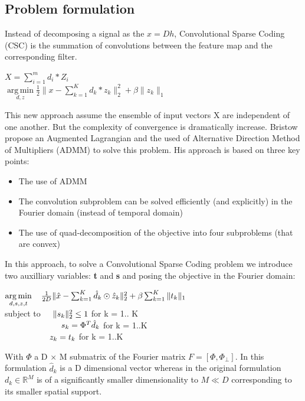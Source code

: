 \documentclass[a4paper,10pt]{article}
\newcommand{\R}{\mathbb{R}}
\DeclareMathOperator*{\argmin}{arg\,min}
\begin{document}
\subsection{Problem formulation}
Instead  of decomposing a signal as the $x = Dh$, Convolutional Sparse Coding (CSC) is the summation of convolutions between the feature map and the corresponding filter.
\begin{center}
 $X = \sum_{i=1}^{m} d_i * Z_i$\\  \vspace{0.4cm}
  $\underset{d, z}{\argmin}  \frac{1}{2} \| x - \sum_{k=1}^{K} d_k * z_k \|_2^2 + \beta \|z_k \|_1$\\

\end{center}
This new approach assume the ensemble of input vectors X are independent of one another. But the complexity of convergence is dramatically increase.
Bristow propose an Augmented Lagrangian and the used of  Alternative Direction Method of Multipliers (ADMM) \cite{6618901} to solve this problem. His approach is based on three key points:
\begin{itemize}
 \item The use of ADMM
 \item The convolution subproblem can be solved efficiently (and explicitly) in the Fourier domain (instead of temporal domain)
\item The use of quad-decomposition of the objective into four subproblems (that are convex)
\end{itemize}
In this approach, to solve a Convolutional Sparse Coding problem we introduce two auxilliary variables: \textbf{t} and \textbf{s} and posing the objective in the Fourier domain:
\begin{center}
$\underset{d, s, z, t}{\argmin} \hspace{0.4cm} \frac{1}{2D} \| \hat{x} - \sum_{k=1}^{K} \hat{d}_{k} \odot \hat{z}_k \|^2_2 + \beta \sum_{k=1}^{K} \|t_k\|_1$\\
subject to $\hspace{0.4cm} \|s_k\|^2_2 \leq 1 $ for k = 1.. K\\
                $ \hspace{2.4cm}s_k = \Phi^T \hat{d}_k$ for k = 1..K\\
                $\hspace{1.9cm}z_k = t_k$ for k = 1..K
\end{center}
With $\Phi$ a D $\times$ M submatrix of the Fourier matrix $F = [\Phi,\Phi_\bot]$. In this formulation $\hat{d}_k$ is a D dimensional vector whereas in the original formulation $d_k \in \R^M$  is of a significantly smaller dimensionality to $M \ll D$  corresponding to its smaller spatial support. 
\end{document}

